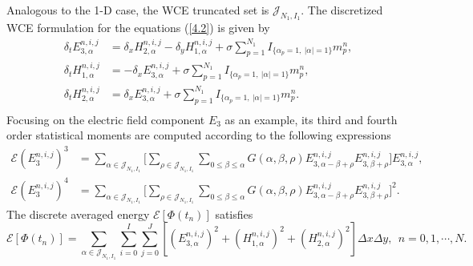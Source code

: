 \documentclass[preprint,12pt]{article}
\numberwithin{figure}{section}
\numberwithin{table}{section}
\numberwithin{equation}{section}
\begin{document}
Analogous to the 1-D case, the WCE truncated set is $\mathcal{J}_{N_1,I_1}$. The discretized WCE formulation for the equations (\ref{4.2}) is given by
\begin{equation*}
\begin{split}
\delta_{t}E_{3,\alpha}^{n,i,j}&=\delta_{x}H_{2,\alpha}^{n,i,j}-\delta_{y}H_{1,\alpha}^{n,i,j}+\sigma \sum_{p=1}^{N_1}I_{\{\alpha_{p}=1,~|\alpha|=1\}}m_{p}^{n},\\
\delta_{t}H_{1,\alpha}^{n,i,j}&=-\delta_{x}E_{3,\alpha}^{n,i,j}+\sigma \sum_{p=1}^{N_1}I_{\{\alpha_{p}=1,~|\alpha|=1\}}m_{p}^{n},\\
\delta_{t}H_{2,\alpha}^{n,i,j}&=\delta_{x}E_{3,\alpha}^{n,i,j}+\sigma \sum_{p=1}^{N_1}I_{\{\alpha_{p}=1,~|\alpha|=1\}}m_{p}^{n}.\\
\end{split}
\end{equation*}
Focusing on the electric field component $E_3$ as an example, its third and fourth order statistical moments are computed according to the following expressions
\begin{equation*}
\begin{split}
\mathcal{E}\left(E_3^{n,i,j}\right)^3&=\sum_{\alpha\in \mathcal{J}_{N_1,I_1}}\big[ \sum_{\rho\in \mathcal{J}_{N_1,I_1}}
\sum_{0\le \beta\le \alpha}G(\alpha,\beta,\rho)
 E^{n,i,j}_{3,\alpha-\beta+\rho}E^{n,i,j}_{3,\beta+\rho}\big]E^{n,i,j}_{3,\alpha},\\
\mathcal{E}\left(E_3^{n,i,j}\right)^4&=\sum_{\alpha\in \mathcal{J}_{N_1,I_1}}\big[\sum_{\rho\in \mathcal{J}_{N_1,I_1}}
\sum_{0\le \beta\le \alpha}G(\alpha,\beta,\rho)
 E^{n,i,j}_{3,\alpha-\beta+\rho}E^{n,i,j}_{3,\beta+\rho}\big]^2.
\end{split}
\end{equation*} 
The discrete averaged energy $\mathcal{E}\left[\Phi(t_n)\right]$ satisfies 
\begin{equation*}
\mathcal{E}\left[\Phi(t_n)\right]=\sum_{\alpha\in \mathcal{J}_{N_1,I_1}}\sum_{i=0}^{I}\sum_{j=0}^{J}\left[\left(E_{3,\alpha}^{n,i,j}\right)^2+\left(H_{1,\alpha}^{n,i,j}\right)^2+\left(H_{2,\alpha}^{n,i,j}\right)^2  \right]\Delta x\Delta y,~~n=0,1,\cdots,N.
\end{equation*}
\end{document}
